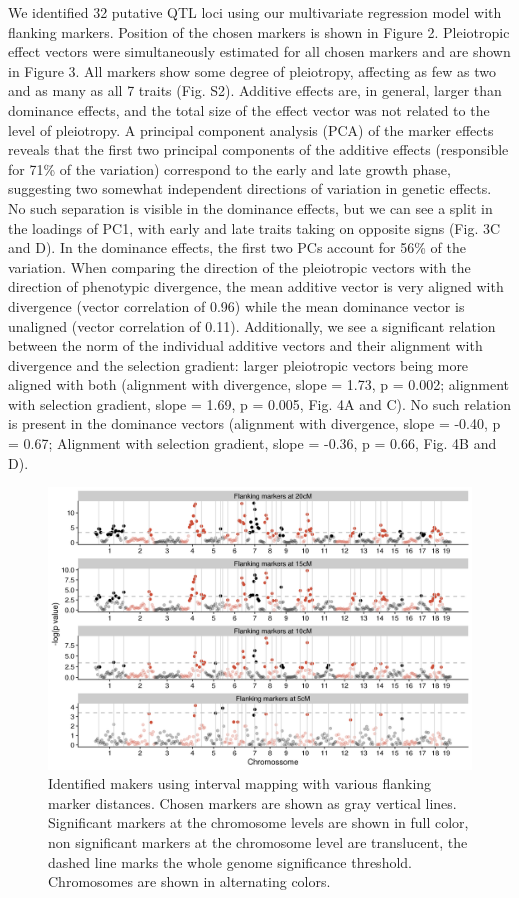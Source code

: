\begin{refsection}
We identified 32 putative QTL loci using our multivariate regression
model with flanking markers. Position of the chosen markers is shown in
Figure 2. Pleiotropic effect vectors were simultaneously estimated for
all chosen markers and are shown in Figure 3. All markers show some
degree of pleiotropy, affecting as few as two and as many as all 7
traits (Fig. S2). Additive effects are, in general, larger than
dominance effects, and the total size of the effect vector was not
related to the level of pleiotropy. A principal component analysis (PCA) of
the marker effects reveals that the first two principal components of
the additive effects (responsible for 71\% of the variation) correspond
to the early and late growth phase, suggesting two somewhat independent
directions of variation in genetic effects. No such separation is
visible in the dominance effects, but we can see a split in the loadings
of PC1, with early and late traits taking on opposite signs (Fig. 3C and
D). In the dominance effects, the first two PCs account for 56\% of the
variation. When comparing the direction of the pleiotropic vectors with
the direction of phenotypic divergence, the mean additive vector is very
aligned with divergence (vector correlation of 0.96) while the mean
dominance vector is unaligned (vector correlation of 0.11).
Additionally, we see a significant relation between the norm of the
individual additive vectors and their alignment with divergence and the
selection gradient: larger pleiotropic vectors being more aligned with
both (alignment with divergence, slope = 1.73, p = 0.002; alignment with
selection gradient, slope = 1.69, p = 0.005, Fig. 4A and C). No such
relation is present in the dominance vectors (alignment with divergence,
slope = -0.40, p = 0.67; Alignment with selection gradient, slope =
-0.36, p = 0.66, Fig. 4B and D).

\begin{figure}
\includegraphics[width=\linewidth]{chapter_JoH-Melo_etal/media/growth_manhattan.png}
\caption[Mapped markers]{Identified makers using interval mapping with various
flanking marker distances. Chosen markers are shown as gray vertical
lines. Significant markers at the chromosome levels are shown in full
color, non significant markers at the chromosome level are translucent,
the dashed line marks the whole genome significance threshold.
Chromosomes are shown in alternating
colors.}
\end{figure}


\end{refsection}
